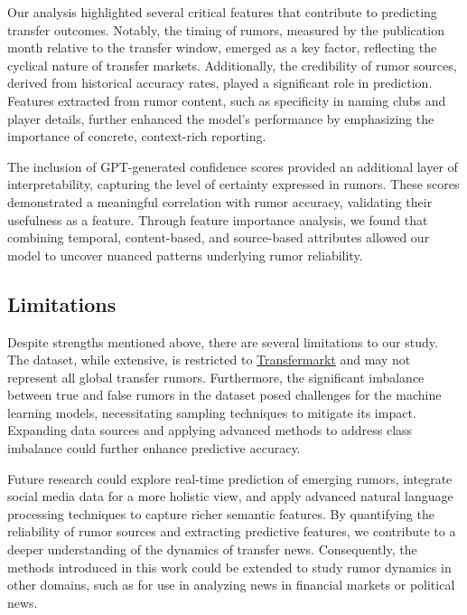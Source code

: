 Our analysis highlighted several critical features that contribute to predicting transfer outcomes. Notably, the timing of rumors, measured by the publication month relative to the transfer window, emerged as a key factor, reflecting the cyclical nature of transfer markets. Additionally, the credibility of rumor sources, derived from historical accuracy rates, played a significant role in prediction. Features extracted from rumor content, such as specificity in naming clubs and player details, further enhanced the model’s performance by emphasizing the importance of concrete, context-rich reporting.

The inclusion of GPT-generated confidence scores provided an additional layer of interpretability, capturing the level of certainty expressed in rumors. These scores demonstrated a meaningful correlation with rumor accuracy, validating their usefulness as a feature. Through feature importance analysis, we found that combining temporal, content-based, and source-based attributes allowed our model to uncover nuanced patterns underlying rumor reliability.

\subsection{Limitations}
Despite strengths mentioned above, there are several limitations to our study. The dataset, while extensive, is restricted to \href{https://www.transfermarkt.co.uk}{Transfermarkt} and may not represent all global transfer rumors. Furthermore, the significant imbalance between true and false rumors in the dataset posed challenges for the machine learning models, necessitating sampling techniques to mitigate its impact. Expanding data sources and applying advanced methods to address class imbalance could further enhance predictive accuracy.

Future research could explore real-time prediction of emerging rumors, integrate social media data for a more holistic view, and apply advanced natural language processing techniques to capture richer semantic features. By quantifying the reliability of rumor sources and extracting predictive features, we contribute to a deeper understanding of the dynamics of transfer news. Consequently, the methods introduced in this work could be extended to study rumor dynamics in other domains, such as for use in analyzing news in financial markets or political news.

